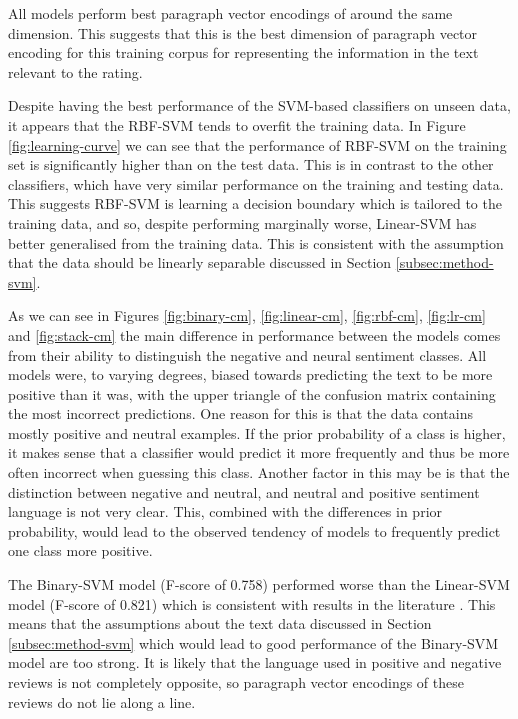 \documentclass[11pt]{article}
\begin{document}
All models perform best paragraph vector encodings of around the same dimension. This suggests that this is the best dimension of paragraph vector encoding for this training corpus for representing the information in the text relevant to the rating.

Despite having the best performance of the SVM-based classifiers on unseen data, it appears that the RBF-SVM tends to overfit the training data. In Figure \ref{fig:learning-curve} we can see that the performance of RBF-SVM on the training set is significantly higher than on the test data. This is in contrast to the other classifiers, which have very similar performance on the training and testing data. This suggests RBF-SVM is learning a decision boundary which is tailored to the training data, and so, despite performing marginally worse, Linear-SVM has better generalised from the training data. This is consistent with the assumption that the data should be linearly separable discussed in Section \ref{subsec:method-svm}.

As we can see in Figures \ref{fig:binary-cm}, \ref{fig:linear-cm}, \ref{fig:rbf-cm}, \ref{fig:lr-cm} and \ref{fig:stack-cm} the main difference in performance between the models comes from their ability to distinguish the negative and neural sentiment classes. All models were, to varying degrees, biased towards predicting the text to be more positive than it was, with the upper triangle of the confusion matrix containing the most incorrect predictions. One reason for this is that the data contains mostly positive and neutral examples. If the prior probability of a class is higher, it makes sense that a classifier would predict it more frequently and thus be more often incorrect when guessing this class. Another factor in this may be is that the distinction between negative and neutral, and neutral and positive sentiment language is not very clear. This, combined with the differences in prior probability, would lead to the observed tendency of models to frequently predict one class more positive.

The Binary-SVM model (F-score of 0.758) performed worse than the Linear-SVM model (F-score of 0.821) which is consistent with results in the literature \cite{koppel_importance_2006}. This means that the assumptions about the text data discussed in Section \ref{subsec:method-svm} which would lead to good performance of the Binary-SVM model are too strong. It is likely that the language used in positive and negative reviews is not completely opposite, so paragraph vector encodings of these reviews do not lie along a line.
\end{document}
